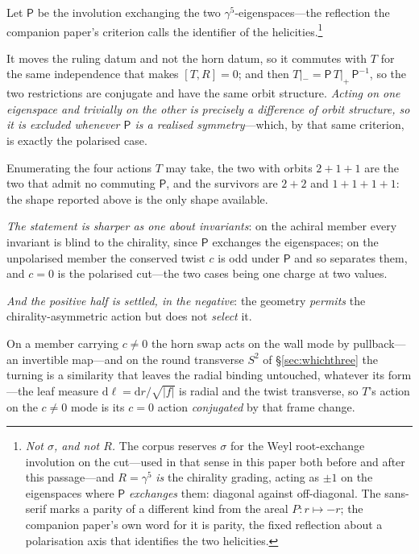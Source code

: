 \documentclass[11pt]{article}
\newcommand{\dd}{\mathrm{d}}
\begin{document}
Let $\mathsf{P}$ be the involution exchanging the two $\gamma^5$-eigenspaces---the reflection the companion paper's criterion calls the identifier of the helicities.\footnote{\emph{Not $\sigma$, and not $R$.} The corpus reserves $\sigma$ for the Weyl root-exchange involution on the cut---used in that sense in this paper both before and after this passage---and $R=\gamma^{5}$ \emph{is} the chirality grading, acting as $\pm1$ on the eigenspaces where $\mathsf{P}$ \emph{exchanges} them: diagonal against off-diagonal. The sans-serif marks a parity of a different kind from the areal $P:r\mapsto-r$; the companion paper's own word for it is parity, the fixed reflection about a polarisation axis that identifies the two helicities.} 

It moves the ruling datum and not the horn datum, so it commutes with $T$ for the same independence that makes $[T,R]=0$; and then $T|_-=\mathsf{P}\,T|_+\,\mathsf{P}^{-1}$, so the two restrictions are conjugate and have the same orbit structure. \emph{Acting on one eigenspace and trivially on the other is precisely a difference of orbit structure, so it is excluded whenever $\mathsf{P}$ is a realised symmetry}---which, by that same criterion, is exactly the polarised case. 

Enumerating the four actions $T$ may take, the two with orbits $2+1+1$ are the two that admit no commuting $\mathsf{P}$, and the survivors are $2+2$ and $1+1+1+1$: the shape reported above is the only shape available. 

\emph{The statement is sharper as one about invariants}: on the achiral member every invariant is blind to the chirality, since $\mathsf{P}$ exchanges the eigenspaces; on the unpolarised member the conserved twist $c$ is odd under $\mathsf{P}$ and so separates them, and $c=0$ is the polarised cut---the two cases being one charge at two values. 

\emph{And the positive half is settled, in the negative}: the geometry \emph{permits} the chirality-asymmetric action but does not \emph{select} it. 

On a member carrying $c\neq0$ the horn swap acts on the wall mode by pullback---an invertible map---and on the round transverse $S^2$ of \S\ref{sec:whichthree} the turning is a similarity that leaves the radial binding untouched, whatever its form---the leaf measure $\dd\ell=\dd r/\sqrt{\lvert f\rvert}$ is radial and the twist transverse, so $T$'s action on the $c\neq0$ mode is its $c=0$ action \emph{conjugated} by that frame change. 
\end{document}
